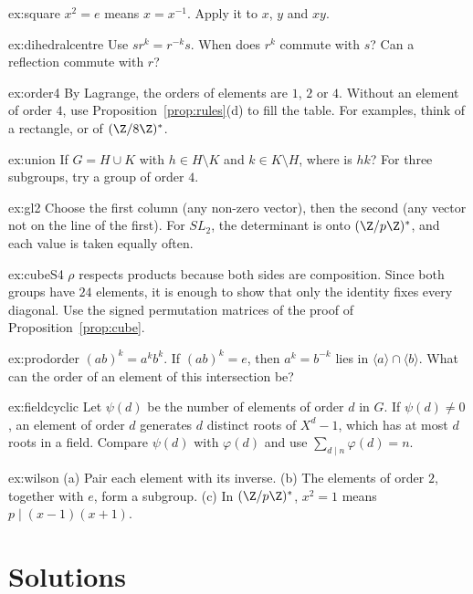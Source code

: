 \begin{hint}{ex:square}
$x^2=e$ means $x=x^{-1}$. Apply it to $x$, $y$ and $xy$.
\end{hint}
\begin{hint}{ex:dihedralcentre}
Use $sr^k=r^{-k}s$. When does $r^k$ commute with $s$? Can a reflection commute with $r$?
\end{hint}
\begin{hint}{ex:order4}
By Lagrange, the orders of elements are $1$, $2$ or $4$. Without an element of order $4$, use Proposition~\ref{prop:rules}(d) to fill the table. For examples, think of a rectangle, or of $(\Z/8\Z)^*$.
\end{hint}
\begin{hint}{ex:union}
If $G=H\cup K$ with $h\in H\setminus K$ and $k\in K\setminus H$, where is $hk$? For three subgroups, try a group of order $4$.
\end{hint}
\begin{hint}{ex:gl2}
Choose the first column (any non-zero vector), then the second (any vector not on the line of the first). For $SL_2$, the determinant is onto $(\Z/p\Z)^*$, and each value is taken equally often.
\end{hint}
\begin{hint}{ex:cubeS4}
$\rho$ respects products because both sides are composition. Since both groups have $24$ elements, it is enough to show that only the identity fixes every diagonal. Use the signed permutation matrices of the proof of Proposition~\ref{prop:cube}.
\end{hint}
\begin{hint}{ex:prodorder}
$(ab)^k=a^kb^k$. If $(ab)^k=e$, then $a^k=b^{-k}$ lies in $\langle a\rangle\cap\langle b\rangle$. What can the order of an element of this intersection be?
\end{hint}
\begin{hint}{ex:fieldcyclic}
Let $\psi(d)$ be the number of elements of order $d$ in $G$. If $\psi(d)\ne0$, an element of order $d$ generates $d$ distinct roots of $X^d-1$, which has at most $d$ roots in a field. Compare $\psi(d)$ with $\varphi(d)$ and use $\sum_{d\mid n}\varphi(d)=n$.
\end{hint}
\begin{hint}{ex:wilson}
(a) Pair each element with its inverse. (b) The elements of order $2$, together with $e$, form a subgroup. (c) In $(\Z/p\Z)^*$, $x^2=1$ means $p\mid(x-1)(x+1)$.
\end{hint}

\section{Solutions}

